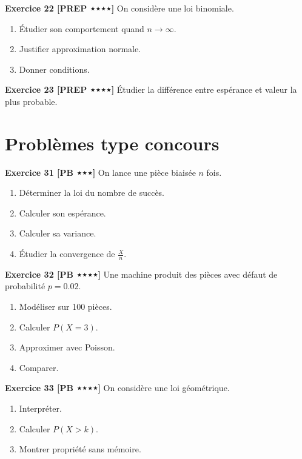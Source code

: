 \documentclass[11pt,a4paper]{article}
\begin{document}
\textbf{Exercice 22 [PREP ⋆⋆⋆⋆]}  
On considère une loi binomiale.  
\begin{enumerate}
\item Étudier son comportement quand $n\to\infty$.
\item Justifier approximation normale.
\item Donner conditions.
\end{enumerate}

\textbf{Exercice 23 [PREP ⋆⋆⋆⋆]}  
Étudier la différence entre espérance et valeur la plus probable.

\section{Problèmes type concours}

\textbf{Exercice 31 [PB ⋆⋆⋆]}  
On lance une pièce biaisée $n$ fois.  

\begin{enumerate}
\item Déterminer la loi du nombre de succès.
\item Calculer son espérance.
\item Calculer sa variance.
\item Étudier la convergence de $\frac{X}{n}$.
\end{enumerate}

\textbf{Exercice 32 [PB ⋆⋆⋆⋆]}  
Une machine produit des pièces avec défaut de probabilité $p=0.02$.  

\begin{enumerate}
\item Modéliser sur 100 pièces.
\item Calculer $P(X=3)$.
\item Approximer avec Poisson.
\item Comparer.
\end{enumerate}

\textbf{Exercice 33 [PB ⋆⋆⋆⋆]}  
On considère une loi géométrique.

\begin{enumerate}
\item Interpréter.
\item Calculer $P(X>k)$.
\item Montrer propriété sans mémoire.
\end{enumerate}
\end{document}
